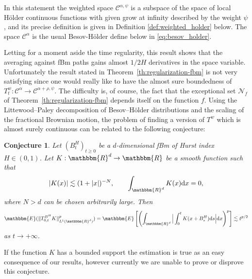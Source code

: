 \documentclass[a4paper,11pt]{article}
\newcommand{\mathd}{\mathrm{d}}
\newtheorem{conjecture}[theorem]{Conjecture}
\newcommand{\CC}{\mathscr C}
\newcommand{\CN}{\mathscr N}
\begin{document}
In this statement the weighted space $\CC^{\alpha , \psi}$ is a subspace of
the space of local Hölder continuous functions with given grow at infinity
described by the weight $\psi$, and its precise definition is given in Definition \ref{def:weighted_holder} below. The space $\CC^\alpha$ is the usual Besov-Hölder define below in \eqref{eq:besov_holder}.



Letting for a moment aside the time regularity, this result shows that the
averaging against fBm paths gains almost $1/2H$ derivatives in the space
variable. Unfortunately the result stated in
Theorem~\ref{th:regularization-fbm} is not very satisfying since one would
really like to have the almost sure boundedness of $T^{w}_{t} : \CC^{\alpha}
\rightarrow \CC^{\alpha + \rho , \psi}$. The difficulty is, of course, the
fact that the exceptional set $\CN_{f}$ of
Theorem~\ref{th:regularization-fbm} depends itself on the function $f$. Using
the Littewood--Paley decomposition of Besov--Hölder distributions and the
scaling of the fractional Brownian motion, the problem of finding a version of
$T^{w}$ which is almost surely continuous can be related to the following
conjecture:

\begin{conjecture}
  Let $(B^{H}_{t} )_{t \geqslant 0}$ be a $d$-dimensional fBm of Hurst index
  $H \in ( 0,1 )$. Let $K:\mathbbm{R}^{d} \rightarrow \mathbbm{R}$ be a smooth
  function such that
  \[ | K ( x ) | \lesssim ( 1+ | x | )^{-N} , \hspace{2em}
     \int_{\mathbbm{R}^{d}} K ( x ) \mathd x=0, \]
  where $N>d$ can be chosen arbitrarily large. Then
  \[ \mathbbm{E} ( \| T^{B^{H}}_{0,t} K \|_{L^{1} ( \mathbbm{R}^{d} )}^{p} )
     =\mathbbm{E} \left[ \left( \int_{\mathbbm{R}^{d}} \Big\lvert \int_{0}^{t} K (
     x+B^{H}_{s} ) \mathd s \Big\lvert \mathd x \right)^{p} \right] \lesssim
     t^{p/2} \]
  as $t \rightarrow + \infty$.
\end{conjecture}

If the function $K$ has a bounded support the estimation is true as an easy
consequence of our results, however currently we are unable to prove or
disprove this conjecture.
\end{document}
